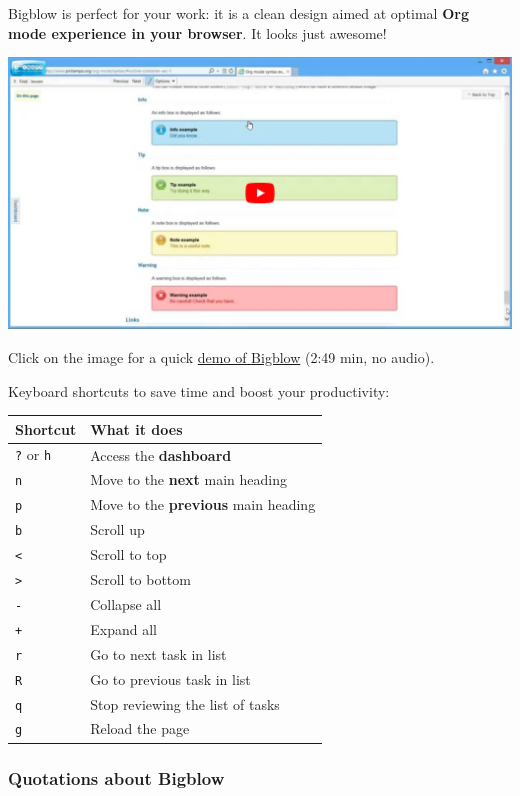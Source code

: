 \documentclass[11pt]{article}
\begin{document}
Bigblow is perfect for your work: it is a clean design aimed at optimal \textbf{Org
mode experience in your browser}.  It looks just awesome!

\href{https://www.youtube.com/watch?v=DnSGSiXYuOk}{\includegraphics[width=.9\linewidth]{docs/bigblow.png}}

Click on the image for a quick \href{https://www.youtube.com/watch?v=DnSGSiXYuOk}{demo of Bigblow} (2:49 min, no audio).

Keyboard shortcuts to save time and boost your productivity:

\begin{center}
\begin{tabular}{ll}
Shortcut & What it does\\[0pt]
\hline
\texttt{?} or \texttt{h} & Access the \textbf{dashboard}\\[0pt]
\texttt{n} & Move to the \textbf{next} main heading\\[0pt]
\texttt{p} & Move to the \textbf{previous} main heading\\[0pt]
\texttt{b} & Scroll up\\[0pt]
\texttt{<} & Scroll to top\\[0pt]
\texttt{>} & Scroll to bottom\\[0pt]
\texttt{-} & Collapse all\\[0pt]
\texttt{+} & Expand all\\[0pt]
\texttt{r} & Go to next task in list\\[0pt]
\texttt{R} & Go to previous task in list\\[0pt]
\texttt{q} & Stop reviewing the list of tasks\\[0pt]
\texttt{g} & Reload the page\\[0pt]
\end{tabular}
\end{center}

\subsubsection*{Quotations about Bigblow}
\label{sec:org1a76c89}
\end{document}
